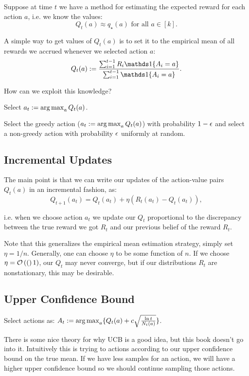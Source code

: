 \documentclass{article}
\begin{document}
Suppose at time $t$ we have a method for estimating the expected reward for each action $a$, i.e. we know the values:
\begin{equation}
    Q_t(a) \approx q_\star(a) \text{ for all } a\in[k].
\end{equation}

A simple way to get values of $Q_t(a)$ is to set it to the empirical mean of all rewards we accrued whenever we selected action $a$:
\begin{equation}
    Q_t(a) := \frac{\sum_{i=1}^{t-1} R_i \ind{A_i = a}}{\sum_{i=1}^{t-1} \ind{A_i = a}}.
\end{equation}

How can we exploit this knowledge? 
\begin{definition}[greedy]
    Select $a_t := \operatorname*{arg\,max}_a Q_t(a)$.
\end{definition}

\begin{definition}
    Select the greedy action ($a_t := \operatorname*{arg\,max}_a Q_t(a)$) with probability $1-\epsilon$ and select a non-greedy action with probability $\epsilon$ uniformly at random.
\end{definition}

\subsection{Incremental Updates}
The main point is that we can write our updates of the action-value pairs $Q_t(a)$ in an incremental fashion, as:
\begin{equation}
    Q_{t+1}(a_t) = Q_{t}(a_t) + \eta (R_t(a_t) - Q_{t}(a_t)),
\end{equation}

i.e. when we choose action $a_t$ we update our $Q_t$ proportional to the discrepancy between the true reward we got $R_t$ and our previous belief of the reward $R_t$.

Note that this generalizes the empirical mean estimation strategy, simply set $\eta = 1/n$. Generally, one can choose $\eta$ to be some function of $n$. If we choose $\eta = \mathcal{O}\left((\right)1)$, our $Q_t$ may never converge, but if our distributions $R_t$ are nonstationary, this may be desirable.

\subsection{Upper Confidence Bound}
\begin{definition}
Select actions as: $A_t := \operatorname*{arg\,max}_a \{Q_t(a) + c \sqrt{\frac{\ln t}{N_t(a)}}\}$.
\end{definition}
There is some nice theory for why UCB is a good idea, but this book doesn't go into it. Intuitively this is trying to actions according to our upper confidence bound on the true mean. If we have less samples for an action, we will have a higher upper confidence bound so we should continue sampling those actions.
\end{document}
